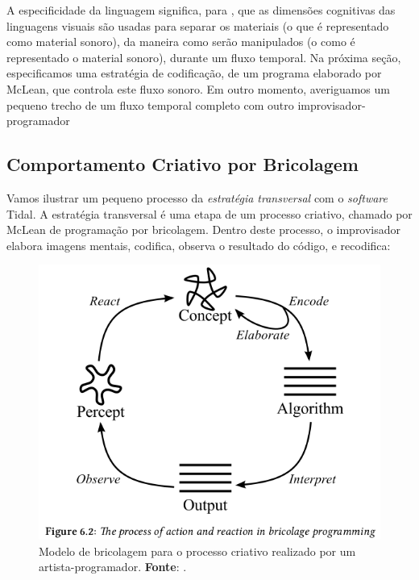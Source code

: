 A especificidade da linguagem significa, para , que as dimensões cognitivas das linguagens visuais são usadas para separar os materiais (o que é representado como material sonoro), da maneira como serão manipulados (o como é representado o material sonoro), durante um fluxo temporal. Na próxima seção, especificamos uma estratégia de codificação, de um programa elaborado por McLean, que controla este fluxo sonoro. Em outro momento, averiguamos um pequeno trecho de um fluxo temporal completo com outro improvisador-programador 
 
\subsection{Comportamento Criativo por Bricolagem}\label{sec:tidal}

Vamos ilustrar um pequeno processo da \emph{estratégia transversal} com o \emph{software} Tidal. A estratégia transversal é uma etapa de um processo criativo, chamado por McLean de programação por bricolagem. Dentro deste processo, o improvisador elabora imagens mentais, codifica, observa o resultado do código, e recodifica:

\begin{figure}[h]
  \centering
  \includegraphics[scale=0.5]{imagens/processo_criativo.png}
  \caption{Modelo de bricolagem para o processo criativo realizado por um artista-programador. \textbf{Fonte}: . }
  \label{fig:processo_criativo}
\end{figure}

